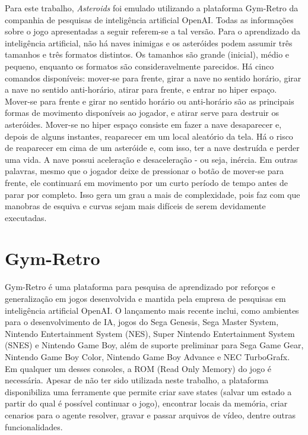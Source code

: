Para este trabalho, \textit{Asteroids} foi emulado utilizando a plataforma Gym-Retro da companhia de pesquisas de inteligência artificial OpenAI. Todas as informações sobre o jogo apresentadas a seguir referem-se a tal versão.
Para o aprendizado da inteligência artificial, não há naves inimigas e os asteróides podem assumir três tamanhos e três formatos distintos. Os tamanhos são grande (inicial), médio e pequeno, enquanto os formatos são consideravelmente parecidos.
Há cinco comandos disponíveis: mover-se para frente, girar a nave no sentido horário, girar a nave no sentido anti-horário, atirar para frente, e entrar no hiper espaço. Mover-se para frente e girar no sentido horário ou anti-horário são as principais formas de movimento disponíveis ao jogador, e atirar serve para destruir os asteróides. Mover-se no hiper espaço consiste em fazer a nave desaparecer e, depois de alguns instantes, reaparecer em um local aleatório da tela. Há o risco de reaparecer em cima de um asteróide e, com isso, ter a nave destruída e perder uma vida.
A nave possui aceleração e desaceleração - ou seja, inércia. Em outras palavras, mesmo que o jogador deixe de pressionar o botão de mover-se para frente, ele continuará em movimento por um curto período de tempo antes de parar por completo. Isso gera um grau a mais de complexidade, pois faz com que manobras de esquiva e curvas sejam mais difíceis de serem devidamente executadas.

\section{Gym-Retro}
\label{sec:gymretro}

Gym-Retro é uma plataforma para pesquisa de aprendizado por reforços e generalização em jogos desenvolvida e mantida pela empresa de pesquisas em inteligência artificial OpenAI. O lançamento mais recente inclui, como ambientes para o desenvolvimento de IA, jogos do Sega Genesis, Sega Master System, Nintendo Entertainment System (NES), Super Nintendo Entertainment System (SNES) e Nintendo Game Boy, além de suporte preliminar para Sega Game Gear, Nintendo Game Boy Color, Nintendo Game Boy Advance e NEC TurboGrafx. Em qualquer um desses consoles, a ROM (Read Only Memory) do jogo é necessária.
Apesar de não ter sido utilizada neste trabalho, a plataforma disponibiliza uma ferramente que permite criar save states (salvar um estado a partir do qual é possível continuar o jogo), encontrar locais da memória, criar cenarios para o agente resolver, gravar e passar arquivos de vídeo, dentre outras funcionalidades.

